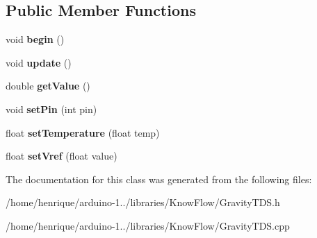 \subsection*{Public Member Functions}
\begin{DoxyCompactItemize}
\item 
void {\bfseries begin} ()\hypertarget{class_gravity_t_d_s_a1918273706ab9bfafe2e9a3ea3a61171}{}\label{class_gravity_t_d_s_a1918273706ab9bfafe2e9a3ea3a61171}

\item 
void {\bfseries update} ()\hypertarget{class_gravity_t_d_s_a56be401a2aa89a4918319e0d8262ea48}{}\label{class_gravity_t_d_s_a56be401a2aa89a4918319e0d8262ea48}

\item 
double {\bfseries get\+Value} ()\hypertarget{class_gravity_t_d_s_a9812b355ecc031f1dfb7039208f1c170}{}\label{class_gravity_t_d_s_a9812b355ecc031f1dfb7039208f1c170}

\item 
void {\bfseries set\+Pin} (int pin)\hypertarget{class_gravity_t_d_s_a9a91e8461f6696ffff169c456eb9cbac}{}\label{class_gravity_t_d_s_a9a91e8461f6696ffff169c456eb9cbac}

\item 
float {\bfseries set\+Temperature} (float temp)\hypertarget{class_gravity_t_d_s_a000fe439b71ff425ddbb27d5bfd480a9}{}\label{class_gravity_t_d_s_a000fe439b71ff425ddbb27d5bfd480a9}

\item 
float {\bfseries set\+Vref} (float value)\hypertarget{class_gravity_t_d_s_ab7732b7a1ac0c4725b48d9c601830176}{}\label{class_gravity_t_d_s_ab7732b7a1ac0c4725b48d9c601830176}

\end{DoxyCompactItemize}


The documentation for this class was generated from the following files\+:\begin{DoxyCompactItemize}
\item 
/home/henrique/arduino-\/1../libraries/\+Know\+Flow/Gravity\+T\+D\+S.\+h\item 
/home/henrique/arduino-\/1../libraries/\+Know\+Flow/Gravity\+T\+D\+S.\+cpp\end{DoxyCompactItemize}
